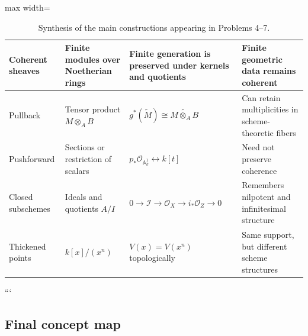 \documentclass[12pt,a4paper]{article}
\theoremstyle{notespace}
\begin{document}
\begin{table}[htbp]
\begin{adjustbox}{max width=\textwidth}
\begin{tabular}{
				|>{\raggedright\arraybackslash}p{3.9cm}
				|>{\raggedright\arraybackslash}p{5.4cm}
				|>{\raggedright\arraybackslash}p{5.0cm}
				|>{\raggedright\arraybackslash}p{5.2cm}|
			}
			Coherent sheaves
			&
			Finite modules over Noetherian rings
			&
			Finite generation is preserved under kernels and quotients
			&
			Finite geometric data remains coherent
			\\
			\hline
			
			Pullback
			&
			Tensor product
			\(\displaystyle M\otimes_{A}B\)
			&
			\(\displaystyle
			g^{*}(\widetilde{M})
			\cong
			\widetilde{M\otimes_{A}B}
			\)
			&
			Can retain multiplicities in scheme-theoretic fibers
			\\
			\hline
			
			Pushforward
			&
			Sections or restriction of scalars
			&
			\(\displaystyle
			p_{*}\mathcal{O}_{\mathbb{A}^{1}_{k}}
			\longleftrightarrow
			k[t]
			\)
			&
			Need not preserve coherence
			\\
			\hline
			
			Closed subschemes
			&
			Ideals and quotients
			\(\displaystyle A/I\)
			&
			\(\displaystyle
			0
			\longrightarrow
			\mathcal{I}
			\longrightarrow
			\mathcal{O}_{X}
			\longrightarrow
			i_{*}\mathcal{O}_{Z}
			\longrightarrow
			0
			\)
			&
			Remembers nilpotent and infinitesimal structure
			\\
			\hline
			
			Thickened points
			&
			\(\displaystyle k[x]/(x^{n})\)
			&
			\(\displaystyle V(x)=V(x^{n})\)
			topologically
			&
			Same support, but different scheme structures
			\\
			\hline
		\end{tabular}
	\end{adjustbox}
	\caption{Synthesis of the main constructions appearing in Problems 4--7.}
	\label{tab:complete-synthesis-problems-4-7}
\end{table}
```

\clearpage		
\subsection{Final concept map}
\end{document}
